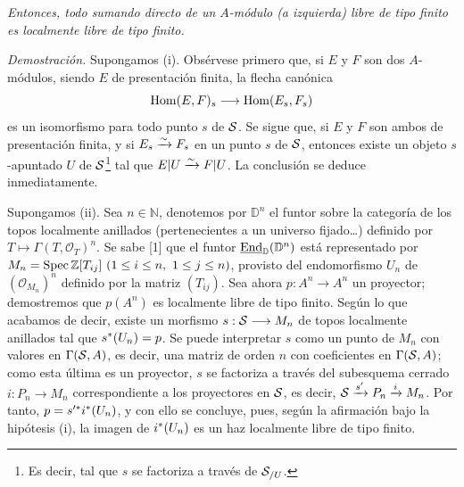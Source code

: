 \emph{Entonces, todo sumando directo de un \(A\)-módulo (a izquierda) libre de tipo finito es localmente libre de tipo finito.}

\emph{Demostración.} Supongamos (i). Obsérvese primero que, si \(E\) y \(F\) son dos \(A\)-módulos, siendo \(E\) de presentación finita, la flecha canónica
\[
  \Hom(E,F)_s\longrightarrow\Hom(E_s,F_s)
\]
es un isomorfismo para todo punto \(s\) de \(\sisi{S}{\mathcal S}\). Se sigue que, si \(E\) y \(F\) son ambos de presentación finita, y si \(E_s\qis F_s\) en un punto \(s\) de \(\sisi{S}{\mathcal S}\), entonces existe un objeto \(s\)-apuntado \(U\) de \(\sisi{S}{\mathcal S}\)\footnote{Es decir, tal que \(s\) se factoriza a través de \(\sisi{S_{/U}}{\mathcal S_{/U}}\).} tal que \(E|U\qis F|U\). La conclusión se deduce inmediatamente.

Supongamos (ii). Sea \(n\in\mathbb N\), denotemos por \(\mathbb D^n\) el funtor sobre la categoría de los topos localmente anillados (pertenecientes a un universo fijado\dots) definido por \(T\longmapsto\Gamma(T,\mathcal O_T)^n\). Se sabe [1] que el funtor \(\underline{\End}_{\mathbb D}(\mathbb D^n)\) está representado por \(M_n=\Spec\mathbb Z[T_{ij}]\ (1\leq i\leq n,\ 1\leq j\leq n)\), provisto del endomorfismo \(U_n\) de \((\mathcal O_{M_n})^n\) definido por la matriz \((T_{ij})\). Sea ahora \(p:A^n\longrightarrow A^n\) un proyector; demostremos que \(p(A^n)\) es localmente libre de tipo finito. Según lo que acabamos de decir, existe un morfismo \(s:\sisi{S}{\mathcal S}\longrightarrow M_n\) de topos localmente anillados tal que \(s^*(\sisi{u_n}{U_n})=p\). Se puede interpretar \(s\) como un punto de \(M_n\) con valores en \(\Gamma(\sisi{S}{\mathcal S},A)\), es decir, una matriz de orden \(n\) con coeficientes en \(\Gamma(\sisi{S}{\mathcal S},A)\); como esta última es un proyector, \(s\) se factoriza a través del subesquema cerrado \(i:P_n\to M_n\) correspondiente a los proyectores en \(\sisi{S}{\mathcal S}\), es decir, \(\sisi{S}{\mathcal S}\xrightarrow{s'}P_n\xrightarrow{i}M_n\). Por tanto, \(p=s'^*i^*(\sisi{u_n}{U_n})\), y con ello se concluye, pues, según la afirmación bajo la hipótesis (i), la imagen de \(i^*(\sisi{u_n}{U_n})\) es un haz localmente libre de tipo finito.

